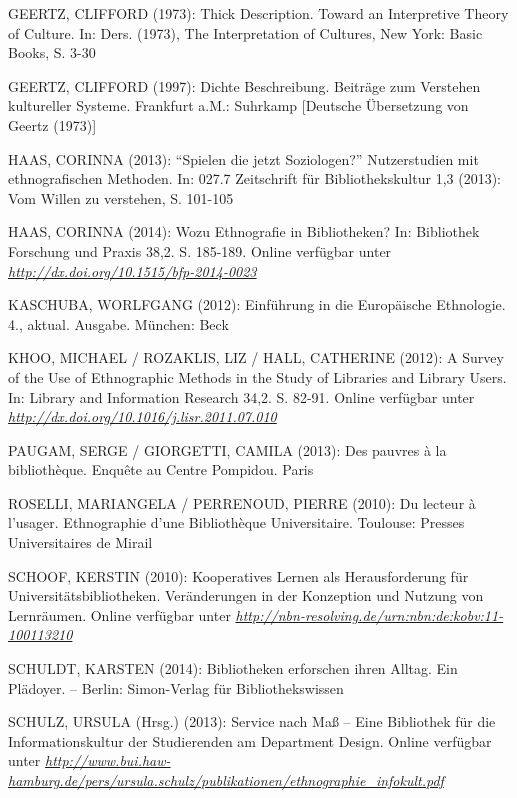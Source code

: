 \documentclass[a4paper,
fontsize=11pt,
oneside,
numbers=noperiodatend,
parskip=half-,
bibliography=totoc,
final
]{scrartcl}
\begin{document}
GEERTZ, CLIFFORD (1973): Thick Description. Toward an Interpretive
Theory of Culture. In: Ders. (1973), The Interpretation of Cultures, New
York: Basic Books, S. 3-30

GEERTZ, CLIFFORD (1997): Dichte Beschreibung. Beiträge zum Verstehen
kultureller Systeme. Frankfurt a.M.: Suhrkamp {[}Deutsche Übersetzung
von Geertz (1973){]}

HAAS, CORINNA (2013): \enquote{Spielen die jetzt Soziologen?}
Nutzerstudien mit ethnografischen Methoden. In: 027.7 Zeitschrift für
Bibliothekskultur 1,3 (2013): Vom Willen zu verstehen, S. 101-105

HAAS, CORINNA (2014): Wozu Ethnografie in Bibliotheken? In: Bibliothek
Forschung und Praxis 38,2. S. 185-189. Online verfügbar unter
\href{http://dx.doi.org/10.1515/bfp-2014-0023}{\emph{http://dx.doi.org/10.1515/bfp-2014-0023}}

KASCHUBA, WORLFGANG (2012): Einführung in die Europäische Ethnologie.
4., aktual. Ausgabe. München: Beck

KHOO, MICHAEL / ROZAKLIS, LIZ / HALL, CATHERINE (2012): A Survey of the
Use of Ethnographic Methods in the Study of Libraries and Library Users.
In: Library and Information Research 34,2. S. 82-91. Online verfügbar
unter
\href{http://dx.doi.org/10.1016/j.lisr.2011.07.010}{\emph{http://dx.doi.org/10.1016/j.lisr.2011.07.010}}

PAUGAM, SERGE / GIORGETTI, CAMILA (2013): Des pauvres à la bibliothèque.
Enquête au Centre Pompidou. Paris

ROSELLI, MARIANGELA / PERRENOUD, PIERRE (2010): Du lecteur à l'usager.
Ethnographie d'une Bibliothèque Universitaire. Toulouse: Presses
Universitaires de Mirail

SCHOOF, KERSTIN (2010): Kooperatives Lernen als Herausforderung für
Universitätsbibliotheken. Veränderungen in der Konzeption und Nutzung
von Lernräumen. Online verfügbar unter
\href{http://nbn-resolving.de/urn:nbn:de:kobv:11-100113210}{\emph{http://nbn-resolving.de/urn:nbn:de:kobv:11-100113210}}

SCHULDT, KARSTEN (2014): Bibliotheken erforschen ihren Alltag. Ein
Plädoyer. -- Berlin: Simon-Verlag für Bibliothekswissen

SCHULZ, URSULA (Hrsg.) (2013): Service nach Maß -- Eine Bibliothek für
die Informationskultur der Studierenden am Department Design. Online
verfügbar unter
\href{http://www.bui.haw-hamburg.de/pers/ursula.schulz/publikationen/ethnographie_infokult.pdf}{\emph{http://www.bui.haw-hamburg.de/pers/ursula.schulz/publikationen/ethnographie\_infokult.pdf}}
\end{document}
